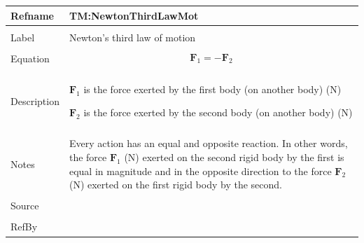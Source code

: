 \documentclass[12pt]{article}
\begin{document}
\noindent \begin{minipage}{\textwidth}
\begin{tabular}{p{} p{}}
\toprule \textbf{Refname} & \textbf{TM:NewtonThirdLawMot}
\label{TM:NewtonThirdLawMot}
\\ \midrule \\
Label & Newton's third law of motion
        \\ \midrule \\
        Equation & \begin{displaymath}
                   {\mathbf{F}_{1}}=-{\mathbf{F}_{2}}
                   \end{displaymath}
                   \\ \midrule \\
                   Description & \begin{symbDescription}
                                 \item{${\mathbf{F}_{1}}$ is the force exerted by the first body (on another body) (N)}
                                 \item{${\mathbf{F}_{2}}$ is the force exerted by the second body (on another body) (N)}
                                 \end{symbDescription}
                                 \\ \midrule \\
                                 Notes & Every action has an equal and opposite reaction. In other words, the force ${\mathbf{F}_{1}}$ (N) exerted on the second rigid body by the first is equal in magnitude and in the opposite direction to the force ${\mathbf{F}_{2}}$ (N) exerted on the first rigid body by the second.
                                         \\ \midrule \\
                                         Source & \\ \midrule \\
                                                  RefBy & 
\\ \bottomrule \end{tabular}
\end{minipage}
\par~
\end{document}
